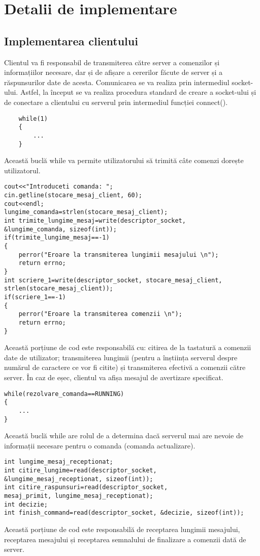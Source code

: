 \documentclass[runningheads]{llncs}
\begin{document}
\section{Detalii de implementare}

\subsection{Implementarea clientului}

Clientul va fi responsabil de transmiterea către server a comenzilor și informațiilor necesare, dar și de afișare a cererilor făcute de server și a răspunsurilor date de acesta. Comunicarea se va realiza prin intermediul socket-ului. Astfel, la început se va realiza procedura standard de creare a socket-ului și de conectare a clientului cu serverul prin intermediul funcției connect().

\begin{verbatim}
    while(1)
    {
        ...
    }
\end{verbatim}
Această buclă while va permite utilizatorului să trimită câte comenzi dorește utilizatorul.

\begin{verbatim}
cout<<"Introduceti comanda: ";
cin.getline(stocare_mesaj_client, 60);   
cout<<endl;
lungime_comanda=strlen(stocare_mesaj_client);
int trimite_lungime_mesaj=write(descriptor_socket, 
&lungime_comanda, sizeof(int)); 
if(trimite_lungime_mesaj==-1)
{
    perror("Eroare la transmiterea lungimii mesajului \n");
    return errno;
}
int scriere_1=write(descriptor_socket, stocare_mesaj_client,
strlen(stocare_mesaj_client));
if(scriere_1==-1)
{
    perror("Eroare la transmiterea comenzii \n");
    return errno;
}
\end{verbatim}
Această porțiune de cod este responsabilă cu: citirea de la tastatură a comenzii date de utilizator; transmiterea lungimii (pentru a înștiința serverul despre numărul de caractere ce vor fi citite) și transmiterea efectivă a comenzii către server. În caz de eșec, clientul va afișa mesajul de avertizare specificat.

\begin{verbatim}
while(rezolvare_comanda==RUNNING)
{
    ...
}
\end{verbatim}
Această buclă while are rolul de a determina dacă serverul mai are nevoie de informații necesare pentru o comanda (comanda actualizare). 

\begin{verbatim}
int lungime_mesaj_receptionat;
int citire_lungime=read(descriptor_socket, 
&lungime_mesaj_receptionat, sizeof(int)); 
int citire_raspunsuri=read(descriptor_socket,
mesaj_primit, lungime_mesaj_receptionat);
int decizie;
int finish_command=read(descriptor_socket, &decizie, sizeof(int));
\end{verbatim}
Această porțiune de cod este responsabilă de receptarea lungimii mesajului, receptarea mesajului și receptarea semnalului de finalizare a comenzii dată de server.
\end{document}
